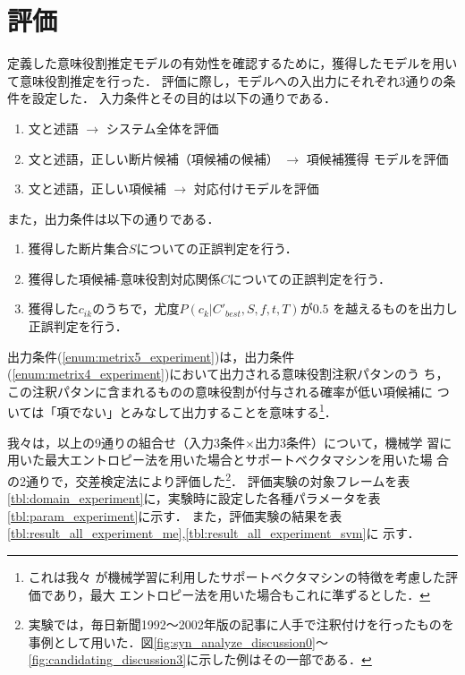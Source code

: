 \documentclass[japanese]{jnlp_1.2b}
\begin{document}
\section{評価}\label{sec:metrix_experiment}

定義した意味役割推定モデルの有効性を確認するために，獲得したモデルを用い
て意味役割推定を行った．
評価に際し，モデルへの入出力にそれぞれ3通りの条件を設定した．
入力条件とその目的は以下の通りである．

\begin{enumerate}
 \item 文と述語 $\rightarrow$ システム全体を評価
       \label{enum:metrix0_experiment}
 \item 文と述語，正しい断片候補（項候補の候補） $\rightarrow$ 項候補獲得
       モデルを評価
       \label{enum:metrix1_experiment}
 \item 文と述語，正しい項候補 $\rightarrow$ 対応付けモデルを評価
       \label{enum:metrix2_experiment}
\end{enumerate}
また，出力条件は以下の通りである．

\begin{enumerate}
 \item 獲得した断片集合$S$についての正誤判定を行う．
       \label{enum:metrix3_experiment}
 \item 獲得した項候補-意味役割対応関係$C$についての正誤判定を行う．
       \label{enum:metrix4_experiment}
 \item 獲得した$c_{ik}$のうちで，尤度$P(c_{k}|C'_{best},S,f,t,T)$が$0.5$
       を越えるものを出力し正誤判定を行う．
       \label{enum:metrix5_experiment}
\end{enumerate}

出力条件(\ref{enum:metrix5_experiment})は，出力条件
(\ref{enum:metrix4_experiment})において出力される意味役割注釈パタンのう
ち，この注釈パタンに含まれるものの意味役割が付与される確率が低い項候補に
ついては「項でない」とみなして出力することを意味する\footnote{これは我々
が機械学習に利用したサポートベクタマシンの特徴を考慮した評価であり，最大
エントロピー法を用いた場合もこれに準ずるとした．}．

我々は，以上の9通りの組合せ（入力3条件$\times$出力3条件）について，機械学
習に用いた最大エントロピー法を用いた場合とサポートベクタマシンを用いた場
合の2通りで，交差検定法により評価した\footnote{実験では，毎日新聞1992〜2002年版の記事に人手で注釈付けを行ったものを事例として用いた．図\ref{fig:syn_analyze_discussion0}〜\ref{fig:candidating_discussion3}に示した例はその一部である．}．
評価実験の対象フレームを表\ref{tbl:domain_experiment}に，実験時に設定した各種パラメータを表\ref{tbl:param_experiment}に示す．
また，評価実験の結果を表
\ref{tbl:result_all_experiment_me},\ref{tbl:result_all_experiment_svm}に
示す．
\end{document}
